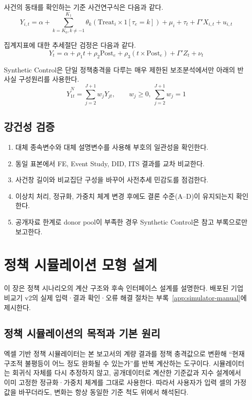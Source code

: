 \documentclass[11pt,a4paper]{report}
\begin{document}
사건의 동태를 확인하는 기준 사건연구식은 다음과 같다.
\begin{equation}
\label{eq:generic_event_study}
Y_{i,t} = \alpha + \sum_{k=K_0, k \neq -1}^{K_1}\theta_k \left(\mathrm{Treat}_i \times 1[\tau_e = k]\right) + \mu_i + \tau_t + \Gamma' X_{i,t} + u_{i,t}
\end{equation}

집계지표에 대한 추세절단 검정은 다음과 같다.
\begin{equation}
\label{eq:generic_its}
Y_t = \alpha + \rho_1 t + \rho_2 \mathrm{Post}_e + \rho_3 (t \times \mathrm{Post}_e) + \Gamma' Z_t + \nu_t
\end{equation}

Synthetic Control은 단일 정책충격을 다루는 매우 제한된 보조분석에서만 아래의 반사실 구성원리를 사용한다.
\begin{equation}
\label{eq:synthetic_control}
\widehat{Y}^{N}_{1t} = \sum_{j=2}^{J+1} w_j Y_{jt}, \qquad w_j \ge 0,\ \sum_{j=2}^{J+1} w_j = 1
\end{equation}

\section{강건성 검증}
\begin{enumerate}[label=\arabic*.]
  \item 대체 종속변수와 대체 설명변수를 사용해 부호의 일관성을 확인한다.
  \item 동일 표본에서 FE, Event Study, DID, ITS 결과를 교차 비교한다.
  \item 사건창 길이와 비교집단 구성을 바꾸어 사전추세 민감도를 점검한다.
  \item 이상치 처리, 정규화, 가중치 체계 변경 후에도 결론 수준(A--D)이 유지되는지 확인한다.
  \item 공개자료 한계로 donor pool이 부족한 경우 Synthetic Control은 참고 부록으로만 보고한다.
\end{enumerate}

\chapter{정책 시뮬레이션 모형 설계}
이 장은 정책 시나리오의 계산 구조와 후속 인터페이스 설계를 설명한다. 배포된 기업 비교기 v2의 실제 입력·결과 확인·오류 해결 절차는 부록~\ref{app:simulator-manual}에 제시한다.
\section{정책 시뮬레이션의 목적과 기본 원리}
엑셀 기반 정책 시뮬레이터는 본 보고서의 계량 결과를 정책 충격값으로 변환해 ``현재 구조적 불평등이 어느 정도 완화될 수 있는가''를 반복 계산하는 도구이다. 시뮬레이터는 회귀식 자체를 다시 추정하지 않고, 공개데이터로 계산한 기준값과 지수 설계에서 이미 고정한 정규화·가중치 체계를 그대로 사용한다. 따라서 사용자가 입력 셀의 가정값을 바꾸더라도, 변화는 항상 동일한 기준 척도 위에서 해석된다.
\end{document}
